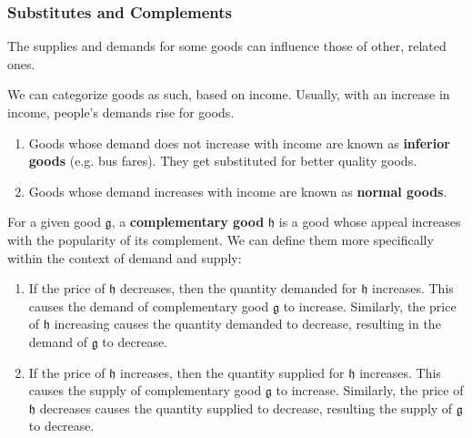 \documentclass{article}
\begin{document}
    \subsubsection{Substitutes and Complements}

      The supplies and demands for some goods can influence those of other, related ones. 

      \begin{definition}
        We can categorize goods as such, based on income. Usually, with an increase in income, people's demands rise for goods. 
        \begin{enumerate}
          \item Goods whose demand does not increase with income are known as \textbf{inferior goods} (e.g. bus fares). They get substituted for better quality goods. 
          \item Goods whose demand increases with income are known as \textbf{normal goods}.
        \end{enumerate}
      \end{definition}

      \begin{definition}[Complements]
        For a given good $\mathfrak{g}$, a \textbf{complementary good} $\mathfrak{h}$ is a good whose appeal increases with the popularity of its complement. We can define them more specifically within the context of demand and supply: 
        \begin{enumerate}
          \item If the price of $\mathfrak{h}$ decreases, then the quantity demanded for $\mathfrak{h}$ increases. This causes the demand of complementary good $\mathfrak{g}$ to increase. Similarly, the price of $\mathfrak{h}$ increasing causes the quantity demanded to decrease, resulting in the demand of $\mathfrak{g}$ to decrease. 
          \item If the price of $\mathfrak{h}$ increases, then the quantity supplied for $\mathfrak{h}$ increases. This causes the supply of complementary good $\mathfrak{g}$ to increase. Similarly, the price of $\mathfrak{h}$ decreases causes the quantity supplied to decrease, resulting the supply of $\mathfrak{g}$ to decrease. 
        \end{enumerate}
      \end{definition}
\end{document}
